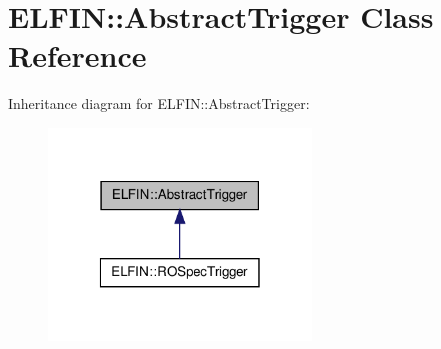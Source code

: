 \hypertarget{class_e_l_f_i_n_1_1_abstract_trigger}{\section{E\-L\-F\-I\-N\-:\-:Abstract\-Trigger Class Reference}
\label{class_e_l_f_i_n_1_1_abstract_trigger}
}


Inheritance diagram for E\-L\-F\-I\-N\-:\-:Abstract\-Trigger\-:
\nopagebreak
\begin{figure}[H]
\begin{center}
\leavevmode
\includegraphics[width=198pt]{class_e_l_f_i_n_1_1_abstract_trigger__inherit__graph}
\end{center}
\end{figure}
